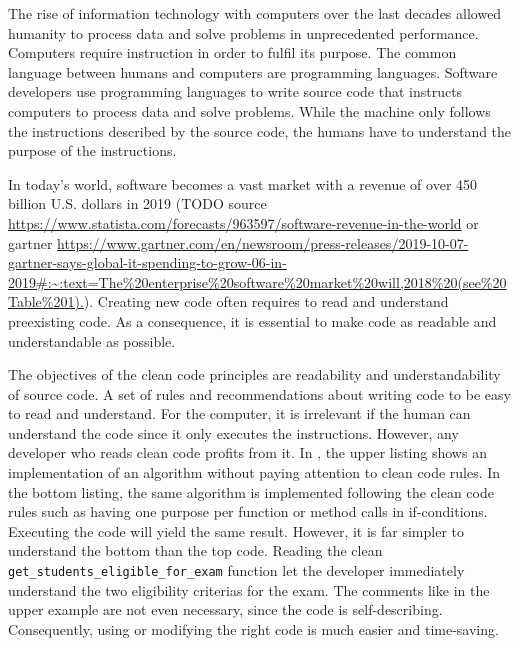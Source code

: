 The rise of information technology with computers over the last decades allowed humanity to process data and solve problems in unprecedented performance. Computers require instruction in order to fulfil its purpose. The common language between humans and computers are programming languages. Software developers use programming languages to write source code that instructs computers to process data and solve problems. While the machine only follows the instructions described by the source code, the humans have to understand the purpose of the instructions. 

In today's world, software becomes a vast market with a revenue of over 450 billion U.S. dollars in 2019 (TODO source \url{https://www.statista.com/forecasts/963597/software-revenue-in-the-world} or gartner \url{https://www.gartner.com/en/newsroom/press-releases/2019-10-07-gartner-says-global-it-spending-to-grow-06-in-2019#:~:text=The%20enterprise%20software%20market%20will,2018%20(see%20Table%201).}). Creating new code often requires to read and understand preexisting code. As a consequence, it is essential to make code as readable and understandable as possible. 

The objectives of the clean code principles are readability and understandability of source code. A set of rules and recommendations about writing code to be easy to read and understand. For the computer, it is irrelevant if the human can understand the code since it only executes the instructions. However, any developer who reads clean code profits from it. In , the upper listing shows an implementation of an algorithm without paying attention to clean code rules. In the bottom listing, the same algorithm is implemented following the clean code rules such as having one purpose per function or method calls in if-conditions. Executing the code will yield the same result. However, it is far simpler to understand the bottom than the top code. Reading the clean \texttt{get\_students\_eligible\_for\_exam} function let the developer immediately understand the two eligibility criterias for the exam. The comments like in the upper example are not even necessary, since the code is self-describing.
Consequently, using or modifying the right code is much easier and time-saving.

